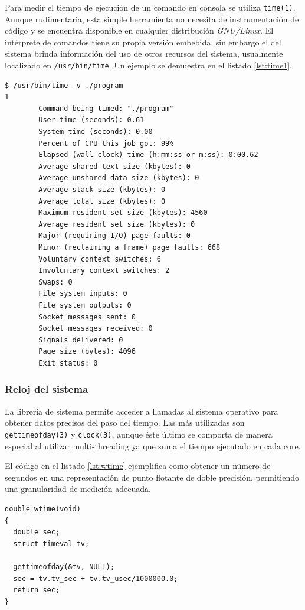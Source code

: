 \documentclass[a4paper]{report}
\begin{document}
Para medir el tiempo de ejecución de un comando en consola se utiliza {\tt time(1)}. Aunque rudimentaria, esta simple herramienta no necesita de instrumentación de código y se encuentra disponible en cualquier distribución {\it GNU/Linux}.
El intérprete de comandos tiene su propia versión embebida, sin embargo el del sistema brinda información del uso de otros recursos del sistema, usualmente localizado en {\tt /usr/bin/time}. Un ejemplo se demuestra en el listado \ref{lst:time1}.

\bigskip

\begin{lstlisting}[caption={Ejecución del Programa},label={lst:time1}]
$ /usr/bin/time -v ./program
1
        Command being timed: "./program"
        User time (seconds): 0.61
        System time (seconds): 0.00
        Percent of CPU this job got: 99%
        Elapsed (wall clock) time (h:mm:ss or m:ss): 0:00.62
        Average shared text size (kbytes): 0
        Average unshared data size (kbytes): 0
        Average stack size (kbytes): 0
        Average total size (kbytes): 0
        Maximum resident set size (kbytes): 4560
        Average resident set size (kbytes): 0
        Major (requiring I/O) page faults: 0
        Minor (reclaiming a frame) page faults: 668
        Voluntary context switches: 6
        Involuntary context switches: 2
        Swaps: 0
        File system inputs: 0
        File system outputs: 0
        Socket messages sent: 0
        Socket messages received: 0
        Signals delivered: 0
        Page size (bytes): 4096
        Exit status: 0
\end{lstlisting}

\subsubsection{Reloj del sistema}

La librería de sistema permite acceder a llamadas al sistema operativo para obtener datos precisos del paso del tiempo.
Las más utilizadas son {\tt gettimeofday(3)} y {\tt clock(3)}, aunque éste último se comporta de manera especial al utilizar multi-threading ya que suma el tiempo ejecutado en cada core.

\bigskip

El código en el listado \ref{lst:wtime} ejemplifica como obtener un número de segundos en una representación de punto flotante de doble precisión, permitiendo una granularidad de medición adecuada.

\begin{lstlisting}[caption={Tiempo de Ejecución},label={lst:wtime}]
double wtime(void)
{
  double sec;
  struct timeval tv;
  
  gettimeofday(&tv, NULL);
  sec = tv.tv_sec + tv.tv_usec/1000000.0;
  return sec;
}
\end{lstlisting}
\end{document}

